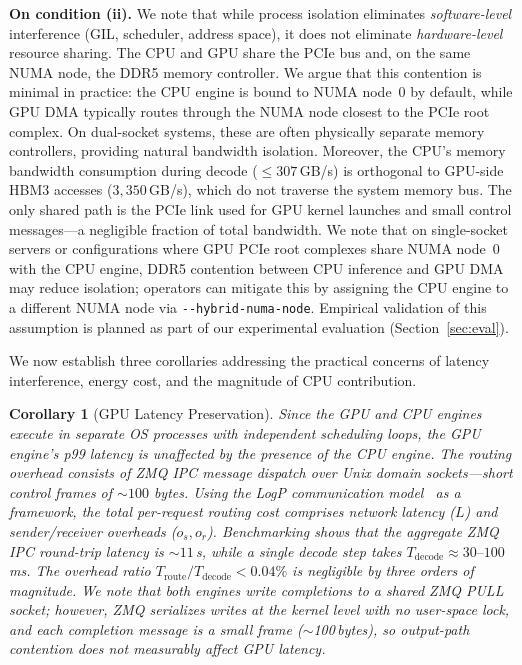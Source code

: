 \documentclass[10pt,conference]{IEEEtran}
\newtheorem{corollary}[theorem]{Corollary}
\begin{document}
\textbf{On condition (ii).}
We note that while process isolation eliminates \emph{software-level} interference (GIL, scheduler, address space), it does not eliminate \emph{hardware-level} resource sharing.
The CPU and GPU share the PCIe bus and, on the same NUMA node, the DDR5 memory controller.
We argue that this contention is minimal in practice: the CPU engine is bound to NUMA node~0 by default, while GPU DMA typically routes through the NUMA node closest to the PCIe root complex.
On dual-socket systems, these are often physically separate memory controllers, providing natural bandwidth isolation.
Moreover, the CPU's memory bandwidth consumption during decode (${\leq}307$\,GB/s) is orthogonal to GPU-side HBM3 accesses ($3{,}350$\,GB/s), which do not traverse the system memory bus.
The only shared path is the PCIe link used for GPU kernel launches and small control messages---a negligible fraction of total bandwidth.
We note that on single-socket servers or configurations where GPU PCIe root complexes share NUMA node~0 with the CPU engine, DDR5 contention between CPU inference and GPU DMA may reduce isolation; operators can mitigate this by assigning the CPU engine to a different NUMA node via \texttt{-{}-hybrid-numa-node}.
Empirical validation of this assumption is planned as part of our experimental evaluation (Section~\ref{sec:eval}).

We now establish three corollaries addressing the practical concerns of latency interference, energy cost, and the magnitude of CPU contribution.

\begin{corollary}[GPU Latency Preservation]
\label{cor:latency}
Since the GPU and CPU engines execute in separate OS processes with independent scheduling loops, the GPU engine's p99 latency is unaffected by the presence of the CPU engine.
The routing overhead consists of ZMQ IPC message dispatch over Unix domain sockets---short control frames of ${\sim}100$ bytes.
Using the LogP communication model~\cite{culler1993logp, alexandrov1995loggp} as a framework, the total per-request routing cost comprises network latency ($L$) and sender/receiver overheads ($o_s, o_r$).
Benchmarking shows that the aggregate ZMQ IPC round-trip latency is ${\sim}11$\,\textmu{}s, while a single decode step takes $T_\text{decode} \approx 30\text{--}100$\,ms.
The overhead ratio $T_\text{route}/T_\text{decode} < 0.04\%$ is negligible by three orders of magnitude.
We note that both engines write completions to a shared ZMQ PULL socket; however, ZMQ serializes writes at the kernel level with no user-space lock, and each completion message is a small frame (${\sim}$100\,bytes), so output-path contention does not measurably affect GPU latency.
\end{corollary}
\end{document}

